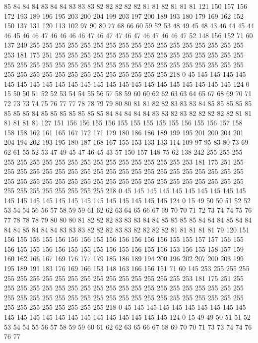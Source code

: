 85 84 84 84 83 84 84 83 83 83 82 82 82 82 82 81 81 82 81 81
81 121 150 157 156 172 193 189 196 195 203 200 204 199 203 197 200 189 193 180
179 169 162 152 150 137 131 120 113 102 97 90 80 77 68 66 60 59 52 53
48 49 45 48 43 46 44 45 44 46 45 46 46 47 46 46 46 46 47 46
47 47 46 47 46 47 46 46 47 52 148 156 152 71 60 137 249 255 255 255
255 255 255 255 255 255 255 255 255 255 255 255 255 255 253 181 175 251 255 255
255 255 255 255 255 255 255 255 255 255 255 255 255 255 255 255 255 255 255 255
255 255 255 255 255 255 255 255 255 255 255 255 255 255 255 255 255 255 255 255
255 255 255 255 255 218 0 45 145 145 145 145 145 145 145 145 145 145 145 145
145 145 145 145 145 145 145 145 145 145 124 0 15 50 50 51 52 52 53 54
54 55 56 57 58 59 60 60 62 62 63 63 64 65 67 68 69 70 71 72
73 73 74 75 76 77 77 78 78 79 79 80 80 81 81 82 82 83 83 83
84 85 85 85 85 85 85 85 85 84 85 85 85 85 85 85 85 84 84 84
84 84 83 83 82 83 82 82 82 82 82 81 81 81 81 81 81 127 151 156
156 155 156 155 155 155 155 155 156 155 156 157 158 158 158 162 161 165 167 172
171 179 180 186 186 189 199 195 201 200 204 201 204 194 202 193 195 180 187 168
167 155 153 133 133 114 109 97 95 83 80 73 69 62 61 55 52 53 47 49
45 47 46 45 43 57 150 157 148 75 62 138 242 255 255 255 255 255 255 255
255 255 255 255 255 255 255 255 255 255 253 181 175 251 255 255 255 255 255 255
255 255 255 255 255 255 255 255 255 255 255 255 255 255 255 255 255 255 255 255
255 255 255 255 255 255 255 255 255 255 255 255 255 255 255 255 255 255 255 255
255 218 0 45 145 145 145 145 145 145 145 145 145 145 145 145 145 145 145 145
145 145 145 145 145 145 124 0 15 49 50 50 51 52 52 53 54 54 56 56
57 58 59 59 61 62 62 63 64 65 66 67 69 70 70 71 72 73 74 74
75 76 77 78 78 78 79 80 80 80 81 82 82 82 83 83 83 84 84 85
85 85 85 84 84 84 85 84 84 84 84 85 84 84 84 83 83 83 82 82
82 83 83 82 82 82 82 81 81 81 81 81 79 120 151 156 155 156 155 156
156 156 155 156 156 156 156 156 155 155 157 157 156 155 156 155 155 156 156 155
155 155 156 155 156 155 156 153 156 155 158 157 159 160 162 166 167 169 176 177
179 185 186 189 194 200 196 202 207 200 203 199 195 189 191 183 176 169 166 153
148 163 166 156 151 71 60 145 253 255 255 255 255 255 255 255 255 255 255 255
255 255 255 255 255 255 253 181 175 251 255 255 255 255 255 255 255 255 255 255
255 255 255 255 255 255 255 255 255 255 255 255 255 255 255 255 255 255 255 255
255 255 255 255 255 255 255 255 255 255 255 255 255 255 255 255 255 218 0 45
145 145 145 145 145 145 145 145 145 145 145 145 145 145 145 145 145 145 145 145
145 145 124 0 15 49 49 50 51 51 52 53 54 54 55 56 57 58 59 59
60 61 62 62 63 65 66 67 68 69 70 70 71 73 73 74 74 76 76 77
